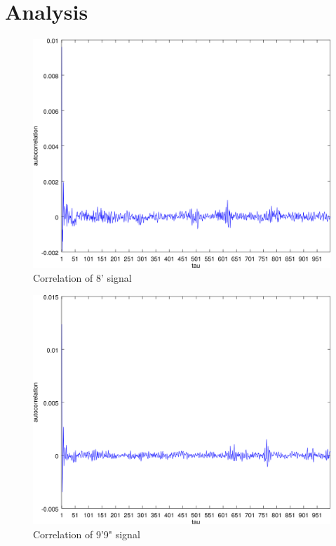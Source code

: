 \documentclass{article}
\begin{document}
   \section{Analysis}
      \begin{figure}[H]
         \includegraphics[width=\textheight/2]{images/cor_8.png}
         \caption{Correlation of 8' signal}
      \end{figure}
      \begin{figure}[H]
         \includegraphics[width=\textheight/2]{images/cor_9.png}
         \caption{Correlation of 9'9" signal}
      \end{figure}
\end{document}
